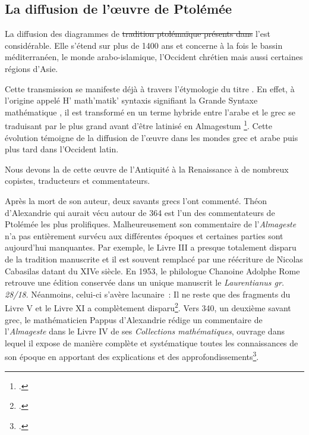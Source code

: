 \subsection{La diffusion de l'œuvre de Ptolémée}
La diffusion des diagrammes de \st{tradition ptolémaïque présents dans} l'\almageste est considérable.
Elle s'étend sur plus de 1400 ans et concerne à la fois le bassin méditerranéen, le monde arabo-islamique, l'Occident chrétien mais aussi certaines régions d'Asie.

Cette transmission se manifeste déjà à travers l'étymologie du titre \almageste.
En effet, à l'origine appelé \og H' math'matik' syntaxis \fg signifiant la \og Grande Syntaxe mathématique \fg,
il est transformé en un terme hybride entre l'arabe et le grec se traduisant par \og le plus grand \fg avant d'être latinisé en \og Almagestum \fg\footcite{raymondjonesPtolemyAccomplishmentsBiography2025}.
Cette évolution témoigne de la diffusion de l'œuvre dans les mondes grec et arabe puis plus tard dans l'Occident latin.

Nous devons la  de cette œuvre de l'Antiquité à la Renaissance à de nombreux copistes, traducteurs et commentateurs.

Après la mort de son auteur, deux savants grecs l'ont commenté.
Théon d'Alexandrie qui aurait vécu autour de 364 est l'un des commentateurs de Ptolémée les plus prolifiques.
Malheureusement son commentaire de l'\textit{Almageste} n'a pas entièrement survécu aux différentes époques et certaines parties sont aujourd'hui manquantes.
Par exemple, le Livre III a presque totalement disparu de la tradition manuscrite et il est souvent remplacé par une réécriture de Nicolas Cabasilas datant du XIVe siècle.
En 1953, le philologue Chanoine Adolphe Rome retrouve une édition conservée dans un unique manuscrit le \textit{Laurentianus gr. 28/18}.
Néanmoins, celui-ci s'avère lacunaire~: Il ne reste que des fragments du Livre V et le Livre XI a complètement disparu\footcite{tihonLivreRetrouveCommentaire1987}.
Vers 340, un deuxième savant grec, le mathématicien Pappus d'Alexandrie rédige un commentaire de l'\textit{Almageste} dans le Livre IV de ses \textit{Collections mathématiques},
ouvrage dans lequel il expose de manière complète et systématique toutes les connaissances de son époque en apportant des explications et des approfondissements\footcite{meyerPAPPUS1999}.


